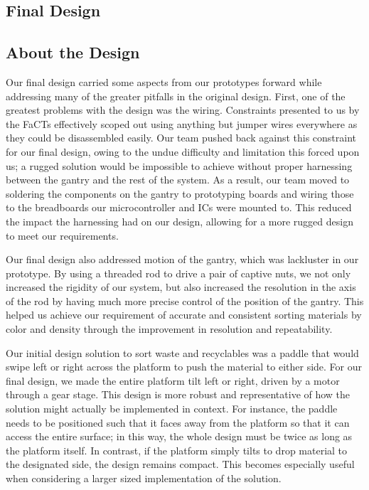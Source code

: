\documentclass[12pt]{article}
\begin{document}
\begin{multicols*}{2}
    \section{Final Design}

        \subsection{About the Design}
            Our final design carried some aspects from our prototypes forward while addressing many of the greater pitfalls in the original design. First, one of the greatest problems with the design was the wiring. Constraints presented to us by the FaCTs effectively scoped out using anything but jumper wires everywhere as they could be disassembled easily. Our team pushed back against this constraint for our final design, owing to the undue difficulty and limitation this forced upon us; a rugged solution would be impossible to achieve without proper harnessing between the gantry and the rest of the system. As a result, our team moved to soldering the components on the gantry to prototyping boards and wiring those to the breadboards our microcontroller and ICs were mounted to. This reduced the impact the harnessing had on our design, allowing for a more rugged design to meet our requirements. 

            Our final design also addressed motion of the gantry, which was lackluster in our prototype. By using a threaded rod to drive a pair of captive nuts, we not only increased the rigidity of our system, but also increased the resolution in the axis of the rod by having much more precise control of the position of the gantry. This helped us achieve our requirement of accurate and consistent sorting materials by color and density through the improvement in resolution and repeatability.

            Our initial design solution to sort waste and recyclables was a paddle that would swipe left or right across the platform to push the material to either side. For our final design, we made the entire platform tilt left or right, driven by a motor through a gear stage. This design is more robust and representative of how the solution might actually be implemented in context. For instance, the paddle needs to be positioned such that it faces away from the platform so that it can access the entire surface; in this way, the whole design must be twice as long as the platform itself. In contrast, if the platform simply tilts to drop material to the designated side, the design remains compact. This becomes especially useful when considering a larger sized implementation of the solution.


\end{multicols*}
\end{document}
